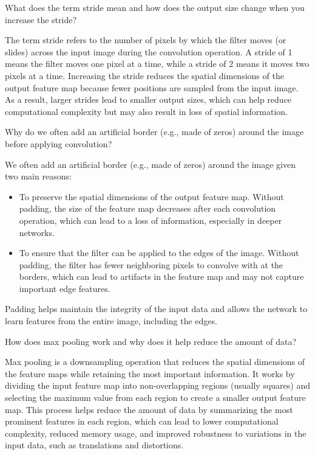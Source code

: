 \begin{ejercicio}[Stride]
    What does the term stride mean and how does the output size change when you increase the stride?

    The term stride refers to the number of pixels by which the filter moves (or slides) across the input image during the convolution operation. A stride of 1 means the filter moves one pixel at a time, while a stride of 2 means it moves two pixels at a time. Increasing the stride reduces the spatial dimensions of the output feature map because fewer positions are sampled from the input image. As a result, larger strides lead to smaller output sizes, which can help reduce computational complexity but may also result in loss of spatial information.
\end{ejercicio}

\begin{ejercicio}[Padding]
    Why do we often add an artificial border (e.g., made of zeros) around the image before applying convolution?

    We often add an artificial border (e.g., made of zeros) around the image given two main reasons:
    \begin{itemize}
        \item To preserve the spatial dimensions of the output feature map. Without padding, the size of the feature map decreases after each convolution operation, which can lead to a loss of information, especially in deeper networks.
        \item To ensure that the filter can be applied to the edges of the image. Without padding, the filter has fewer neighboring pixels to convolve with at the borders, which can lead to artifacts in the feature map and may not capture important edge features.
    \end{itemize}
    Padding helps maintain the integrity of the input data and allows the network to learn features from the entire image, including the edges.
\end{ejercicio}

\begin{ejercicio}
    How does max pooling work and why does it help reduce the amount of data?

    Max pooling is a downsampling operation that reduces the spatial dimensions of the feature maps while retaining the most important information. It works by dividing the input feature map into non-overlapping regions (usually squares) and selecting the maximum value from each region to create a smaller output feature map. This process helps reduce the amount of data by summarizing the most prominent features in each region, which can lead to lower computational complexity, reduced memory usage, and improved robustness to variations in the input data, such as translations and distortions.
\end{ejercicio}


